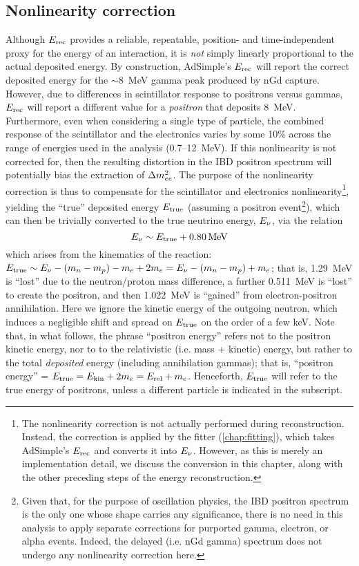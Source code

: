 \documentclass[../thesis.tex]{subfiles}
\begin{document}
\subsection{Nonlinearity correction}
\label{sec:reconEnergyNL}

Although $E_\mathrm{rec}$ provides a reliable, repeatable, position- and time-independent proxy for the energy of an interaction, it is \emph{not} simply linearly proportional to the actual deposited energy. By construction, AdSimple's $E_\mathrm{rec}$ will report the correct deposited energy for the $\sim$8~MeV gamma peak produced by nGd capture. However, due to differences in scintillator response to positrons versus gammas, $E_\mathrm{rec}$ will report a different value for a \emph{positron} that deposits 8~MeV. Furthermore, even when considering a single type of particle, the combined response of the scintillator and the electronics varies by some 10\% across the range of energies used in the analysis (0.7--12~MeV). If this nonlinearity is not corrected for, then the resulting distortion in the IBD positron spectrum will potentially bias the extraction of $\Delta m^2_{ee}$. The purpose of the nonlinearity correction is thus to compensate for the scintillator and electronics nonlinearity\footnote{The nonlinearity correction is not actually performed during reconstruction. Instead, the correction is applied by the fitter (\autoref{chap:fitting}), which takes AdSimple's $E_\mathrm{rec}$ and converts it into $E_\mathrm{\nu}$. However, as this is merely an implementation detail, we discuss the conversion in this chapter, along with the other preceding steps of the energy reconstruction.}, yielding the ``true'' deposited energy $E_\mathrm{true}$ (assuming a positron event\footnote{Given that, for the purpose of oscillation physics, the IBD positron spectrum is the only one whose shape carries any significance, there is no need in this analysis to apply separate corrections for purported gamma, electron, or alpha events. Indeed, the delayed (i.e. nGd gamma) spectrum does not undergo any nonlinearity correction here.}), which can then be trivially converted to the true neutrino energy, $E_\mathrm{\nu}$, via the relation
\begin{equation*}
  E_\mathrm{\nu} \sim E_\mathrm{true} + \SI{0.80}{MeV} 
\end{equation*}
which arises from the kinematics of the reaction: $E_\mathrm{true} \sim E_\mathrm{\nu} - (m_n - m_p) - m_e + 2m_e = E_\mathrm{\nu} - (m_n - m_p) + m_e$; that is, 1.29~MeV is ``lost'' due to the neutron/proton mass difference, a further 0.511~MeV is ``lost'' to create the positron, and then 1.022~MeV is ``gained'' from electron-positron annihilation. Here we ignore the kinetic energy of the outgoing neutron, which induces a negligible shift and spread on $E_\mathrm{true}$ on the order of a few keV. Note that, in what follows, the phrase ``positron energy'' refers not to the positron kinetic energy, nor to to the relativistic (i.e. mass + kinetic) energy, but rather to the total \emph{deposited} energy (including annihilation gammas); that is, ``positron energy'' = $E_\mathrm{true} = E_{\mathrm{kin}} + 2m_e = E_{\mathrm{rel}} + m_e$. Henceforth, $E_\mathrm{true}$ will refer to the true energy of positrons, unless a different particle is indicated in the subscript.
\end{document}
